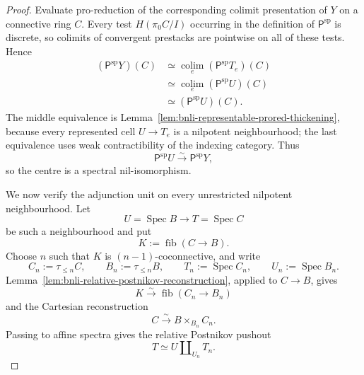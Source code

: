 \begin{proof}
Evaluate pro-reduction of the corresponding colimit presentation of $Y$ on a
connective ring $C$.  Every test
$H(\pi_0C/I)$ occurring in the definition of $\mathsf P^{\mathrm{sp}}$ is
discrete, so colimits of convergent prestacks are pointwise on all of these
tests.  Hence
\[
\begin{aligned}
    (\mathsf P^{\mathrm{sp}}Y)(C)
    &\simeq
    \operatorname*{colim}_{e}
    (\mathsf P^{\mathrm{sp}}T_e)(C)\\
    &\simeq
    \operatorname*{colim}_{e}
    (\mathsf P^{\mathrm{sp}}U)(C)\\
    &\simeq
    (\mathsf P^{\mathrm{sp}}U)(C).
\end{aligned}
\]
The middle equivalence is
Lemma~\ref{lem:bnli-representable-prored-thickening}, because every represented cell
$U\to T_e$ is a nilpotent neighbourhood; the last equivalence uses weak
contractibility of the indexing category.  Thus
\[
\boxed{
    \mathsf P^{\mathrm{sp}}U
    \xrightarrow{\sim}
    \mathsf P^{\mathrm{sp}}Y,}
\]
so the centre is a spectral nil-isomorphism.

We now verify the adjunction unit on every unrestricted nilpotent
neighbourhood.  Let
\[
    U=\operatorname{Spec}B
    \longrightarrow
    T=\operatorname{Spec}C
\]
be such a neighbourhood and put
\[
    K:=\operatorname{fib}(C\to B).
\]
Choose $n$ such that $K$ is $(n-1)$-coconnective, and write
\[
    C_n:=\tau_{\leq n}C,
    \qquad
    B_n:=\tau_{\leq n}B,
    \qquad
    T_n:=\operatorname{Spec}C_n,
    \qquad
    U_n:=\operatorname{Spec}B_n.
\]
Lemma~\ref{lem:bnli-relative-postnikov-reconstruction}, applied to
$C\to B$, gives
\[
    K
    \xrightarrow{\sim}
    \operatorname{fib}(C_n\to B_n)
\]
and the Cartesian reconstruction
\[
\boxed{
    C
    \xrightarrow{\sim}
    B\times_{B_n}C_n.}
\]
Passing to affine spectra gives the relative Postnikov pushout
\[
\boxed{
    T
    \simeq
    U\amalg_{U_n}T_n.}
\]


\end{proof}

